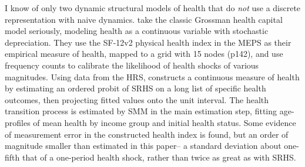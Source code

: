 \documentclass[12pt,pdftex,letterpaper]{article}
\begin{document}
I know of only two dynamic structural models of health that do \textit{not} use a discrete representation with naive dynamics.  \cite{JungTran16} take the classic Grossman health capital model seriously, modeling health as a continuous variable with stochastic depreciation.  They use the SF-12v2 physical health index in the MEPS as their empirical measure of health, mapped to a grid with 15 nodes (p142), and use frequency counts to calibrate the likelihood of health shocks of various magnitudes.  Using data from the HRS, \cite{White18} constructs a continuous measure of health by estimating an ordered probit of SRHS on a long list of specific health outcomes, then projecting fitted values onto the unit interval.  The health transition process is estimated by SMM in the main estimation step, fitting age-profiles of mean health by income group and initial health status.  Some evidence of measurement error in the constructed health index is found, but an order of magnitude smaller than estimated in this paper-- a standard deviation about one-fifth that of a one-period health shock, rather than twice as great as with SRHS.
\end{document}
